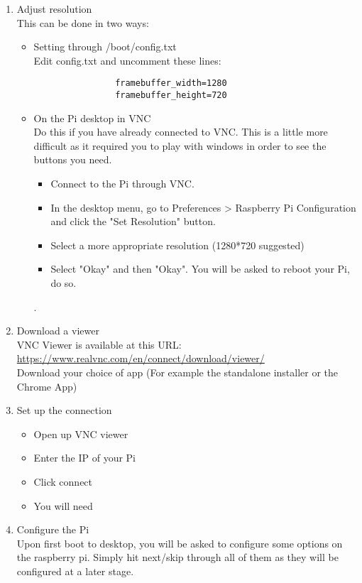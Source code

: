 \begin{enumerate}
    
    \item Adjust resolution\\
    This can be done in two ways:
    \begin{itemize}
        \item Setting through /boot/config.txt\\
            Edit config.txt and uncomment these lines:
            \begin{verbatim}
                framebuffer_width=1280
                framebuffer_height=720
            \end{verbatim}
        \item On the Pi desktop in VNC\\
            Do this if you have already connected to VNC. This is a little more difficult as it required you to play with windows in order to see the buttons you need.
            \begin{itemize}
                \item Connect to the Pi through VNC. 
                \item In the desktop menu, go to Preferences > Raspberry Pi Configuration and click the "Set Resolution" button. 
                \item Select a more appropriate resolution (1280*720 suggested)
                \item Select "Okay" and then "Okay". You will be asked to reboot your Pi, do so.
            \end{itemize}
            .
    \end{itemize}
    \item Download a viewer\\
    VNC Viewer is available at this URL:\\ \href{https://www.realvnc.com/en/connect/download/viewer/}{https://www.realvnc.com/en/connect/download/viewer/}\\ 
    Download your choice of app (For example the standalone installer or the Chrome App)
    \item Set up the connection
        \begin{itemize}
            \item Open up VNC viewer
            \item Enter the IP of your Pi
            \item Click connect
            \item You will need 
        \end{itemize}
    \item Configure the Pi\\
    Upon first boot to desktop, you will be asked to configure some options on the raspberry pi. Simply hit next/skip through all of them as they will be configured at a later stage.
\end{enumerate}
